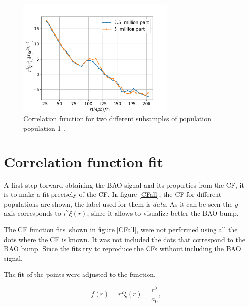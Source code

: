 \begin{figure}[htbp]
       \centering
               \includegraphics[width=0.7\textwidth]{Images/chapter4/CF_1e11_NofP.pdf}
       \caption{\small Correlation function for two different subsamples of population 
       population 1 .}
       \label{NofP}
 \end{figure}


\section{ Correlation function fit }

A first step torward obtaining the BAO signal and its properties from the CF,
it is to make a fit precisely of the CF. In figure \ref{CFall}, the CF 
for different populations are shown, the label used for them is \textit{data}. 
As it can be seen the $y$ axis corresponds to $r^2\xi(r)$, since it allows to visualize better the BAO bump.

The CF function fits, shown in figure \ref{CFall}, were not performed using
all the dots where the CF is known. It was not included the dots that
correspond to the BAO bump. Since the fits try to reproduce the CFs
without including the BAO signal. 

The fit of the points were adjusted to the function, 

\begin{equation}
f(r) = r^2\xi(r) = \frac{r^\lambda}{a_0},
\label{CF_r2}
\end{equation}

